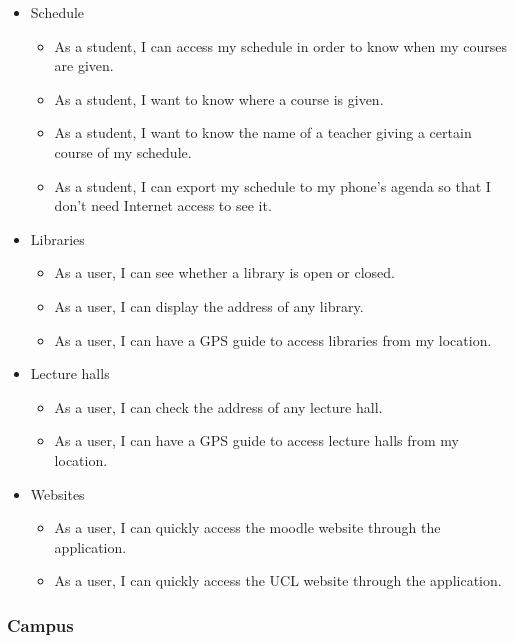 \documentclass[11pt, a4paper]{report}
\begin{document}
\begin{itemize}

\item Schedule
\begin{itemize}
\item As a student, I can access my schedule in order to know when my courses are given.
\item As a student, I want to know where a course is given.
\item As a student, I want to know the name of a teacher giving a certain course of my schedule.
\item As a student, I can export my schedule to my phone's agenda so that I don't need Internet access to see it.
\end{itemize}

\item Libraries
\begin{itemize}
\item As a user, I can see whether a library is open or closed.
\item As a user, I can display the address of any library.
\item As a user, I can have a GPS guide to access libraries from my location.
\end{itemize}

\item Lecture halls
\begin{itemize}
\item As a user, I can check the address of any lecture hall.
\item As a user, I can have a GPS guide to access lecture halls from my location.
\end{itemize}

\item Websites
\begin{itemize}
\item As a user, I can quickly access the moodle website through the application.
\item As a user, I can quickly access the UCL website through the application.
\end{itemize}

\end{itemize}

\subsubsection{Campus}
\end{document}
